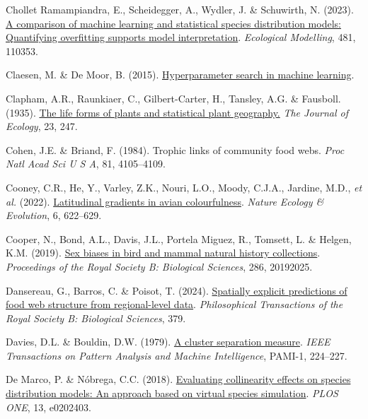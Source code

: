 \documentclass[
  letterpaper,
]{scrbook}
\newlength{\cslhangindent}
\newenvironment{CSLReferences}[2] %
 {\begin{list}{}{%
  \setlength{\itemindent}{0pt}
  \setlength{\leftmargin}{0pt}
  \setlength{\parsep}{0pt}
  \ifodd #1
   \setlength{\leftmargin}{\cslhangindent}
   \setlength{\itemindent}{-1\cslhangindent}
  \fi
  \setlength{\itemsep}{#2\baselineskip}}}
 {\end{list}}
\begin{document}
\begin{CSLReferences}{1}{0}
Chollet Ramampiandra, E., Scheidegger, A., Wydler, J. \& Schuwirth, N.
(2023). \href{https://doi.org/10.1016/j.ecolmodel.2023.110353}{A
comparison of machine learning and statistical species distribution
models: Quantifying overfitting supports model interpretation}.
\emph{Ecological Modelling}, 481, 110353.

Claesen, M. \& De Moor, B. (2015).
\href{https://doi.org/10.48550/ARXIV.1502.02127}{Hyperparameter search
in machine learning}.

Clapham, A.R., Raunkiaer, C., Gilbert-Carter, H., Tansley, A.G. \&
Fausboll. (1935). \href{https://doi.org/10.2307/2256153}{The life forms
of plants and statistical plant geography.} \emph{The Journal of
Ecology}, 23, 247.

Cohen, J.E. \& Briand, F. (1984). Trophic links of community food webs.
\emph{Proc Natl Acad Sci U S A}, 81, 4105--4109.

Cooney, C.R., He, Y., Varley, Z.K., Nouri, L.O., Moody, C.J.A., Jardine,
M.D., \emph{et al.} (2022).
\href{https://doi.org/10.1038/s41559-022-01714-1}{Latitudinal gradients
in avian colourfulness}. \emph{Nature Ecology \& Evolution}, 6,
622--629.

Cooper, N., Bond, A.L., Davis, J.L., Portela Miguez, R., Tomsett, L. \&
Helgen, K.M. (2019). \href{https://doi.org/10.1098/rspb.2019.2025}{Sex
biases in bird and mammal natural history collections}.
\emph{Proceedings of the Royal Society B: Biological Sciences}, 286,
20192025.

Dansereau, G., Barros, C. \& Poisot, T. (2024).
\href{https://doi.org/10.1098/rstb.2023.0166}{Spatially explicit
predictions of food web structure from regional-level data}.
\emph{Philosophical Transactions of the Royal Society B: Biological
Sciences}, 379.

Davies, D.L. \& Bouldin, D.W. (1979).
\href{https://doi.org/10.1109/tpami.1979.4766909}{A cluster separation
measure}. \emph{IEEE Transactions on Pattern Analysis and Machine
Intelligence}, PAMI-1, 224--227.

De Marco, P. \& Nóbrega, C.C. (2018).
\href{https://doi.org/10.1371/journal.pone.0202403}{Evaluating
collinearity effects on species distribution models: An approach based
on virtual species simulation}. \emph{PLOS ONE}, 13, e0202403.


\end{CSLReferences}
\end{document}
